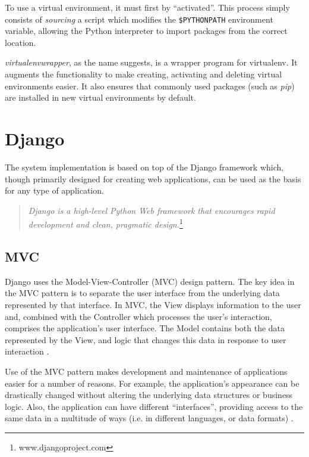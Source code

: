 To use a virtual environment, it must first by ``activated''. This process
simply consists of \emph{sourcing} a script which modifies the
\verb!$PYTHONPATH! environment variable, allowing the Python interpreter to
import packages from the correct location.

\emph{virtualenvwrapper}, as the name suggests, is a wrapper program for
virtualenv. It augments the functionality to make creating, activating and
deleting virtual environments easier. It also ensures that commonly used
packages (such as \emph{pip}) are installed in new virtual environments by
default.

\section{Django}
\label{sec:implementation-django}

The system implementation is based on top of the Django framework which, though
primarily designed for creating web applications, can be used as the basis for
any type of application.

\begin{quote}
    \emph{Django is a high-level Python Web framework that encourages rapid
    development and clean, pragmatic design.}\footnote{www.djangoproject.com}
\end{quote}

\subsection{MVC}

Django uses the Model-View-Controller (MVC) design pattern. The key idea in the
MVC pattern is to separate the user interface from the underlying data
represented by that interface. In MVC, the View displays information to the
user and, combined with the Controller which processes the user's interaction,
comprises the application's user interface. The Model contains both the data
represented by the View, and logic that changes this data in response to user
interaction \cite{leff2001}.

Use of the MVC pattern makes development and maintenance of applications easier
for a number of reasons. For example, the application's appearance can be
drastically changed without altering the underlying data structures or business
logic. Also, the application can have different ``interfaces'', providing
access to the same data in a multitude of ways (i.e. in different languages, or
data formats) \cite{leff2001}.

